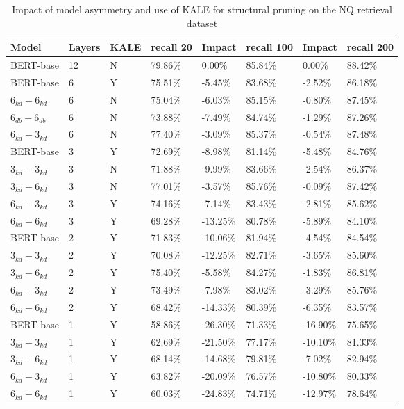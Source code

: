 \begin{table*}[!ht]
    \centering
    \begin{tabular}{|l|l|l|l|l|l|l|l|}
    \hline
        Model & Layers & KALE & recall 20 & Impact & recall 100 & Impact & recall 200 \\ \hline
        BERT-base & 12 & N & 79.86\% & 0.00\% & 85.84\% & 0.00\% & 88.42\% \\ \hline
        BERT-base & 6 & Y & 75.51\% & -5.45\% & 83.68\% & -2.52\% & 86.18\% \\ \hline
        $6_{kd}-6_{kd}$ & 6 & N & 75.04\% & -6.03\% & 85.15\% & -0.80\% & 87.45\% \\ \hline
        $6_{db}-6_{db}$ & 6 & N & 73.88\% & -7.49\% & 84.74\% & -1.29\% & 87.26\% \\ \hline
        $6_{kd}-3_{kd}$ & 6 & N & 77.40\% & -3.09\% & 85.37\% & -0.54\% & 87.48\% \\ \hline
        BERT-base & 3 & Y & 72.69\% & -8.98\% & 81.14\% & -5.48\% & 84.76\% \\ \hline
        $3_{kd}-3_{kd}$ & 3 & N & 71.88\% & -9.99\% & 83.66\% & -2.54\% & 86.37\% \\ \hline
        $3_{kd}-6_{kd}$ & 3 & N & 77.01\% & -3.57\% & 85.76\% & -0.09\% & 87.42\% \\ \hline
        $6_{kd}-3_{kd}$ & 3 & Y & 74.16\% & -7.14\% & 83.43\% & -2.81\% & 85.62\% \\ \hline
        $6_{kd}-6_{kd}$ & 3 & Y & 69.28\% & -13.25\% & 80.78\% & -5.89\% & 84.10\% \\ \hline
        BERT-base & 2 & Y & 71.83\% & -10.06\% & 81.94\% & -4.54\% & 84.54\% \\ \hline
        $3_{kd}-3_{kd}$ & 2 & Y & 70.08\% & -12.25\% & 82.71\% & -3.65\% & 85.60\% \\ \hline
        $3_{kd}-6_{kd}$ & 2 & Y & 75.40\% & -5.58\% & 84.27\% & -1.83\% & 86.81\% \\ \hline
        $6_{kd}-3_{kd}$ & 2 & Y & 73.49\% & -7.98\% & 83.02\% & -3.29\% & 85.76\% \\ \hline
        $6_{kd}-6_{kd}$ & 2 & Y & 68.42\% & -14.33\% & 80.39\% & -6.35\% & 83.57\% \\ \hline
        BERT-base & 1 & Y & 58.86\% & -26.30\% & 71.33\% & -16.90\% & 75.65\% \\ \hline
        $3_{kd}-3_{kd}$ & 1 & Y & 62.69\% & -21.50\% & 77.17\% & -10.10\% & 81.33\% \\ \hline
        $3_{kd}-6_{kd}$ & 1 & Y & 68.14\% & -14.68\% & 79.81\% & -7.02\% & 82.94\% \\ \hline
        $6_{kd}-3_{kd}$ & 1 & Y & 63.82\% & -20.09\% & 76.57\% & -10.80\% & 80.33\% \\ \hline
        $6_{kd}-6_{kd}$ & 1 & Y & 60.03\% & -24.83\% & 74.71\% & -12.97\% & 78.64\% \\ \hline
    \end{tabular}
    \caption{Impact of model asymmetry and use of KALE for structural pruning on the NQ retrieval dataset}
    \label{tab:kale+asym+nq}
\end{table*}

